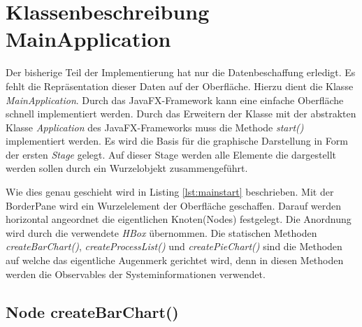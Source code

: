 \section{Klassenbeschreibung MainApplication}
Der bisherige Teil der Implementierung hat nur die Datenbeschaffung erledigt. Es fehlt die Repräsentation dieser Daten auf der Oberfläche. Hierzu dient die Klasse \textit{MainApplication}. Durch das JavaFX-Framework kann eine einfache Oberfläche schnell implementiert werden. Durch das Erweitern der Klasse mit der abstrakten Klasse \textit{Application} des JavaFX-Frameworks muss die Methode \textit{start()} implementiert werden. Es wird die Basis für die graphische Darstellung in Form der ersten \textit{Stage} gelegt. Auf dieser Stage werden alle Elemente die dargestellt werden sollen durch ein Wurzelobjekt zusammengeführt. 
 
Wie dies genau geschieht wird in Listing \ref{lst:mainstart} beschrieben. Mit der BorderPane wird ein Wurzelelement der Oberfläche geschaffen. Darauf werden horizontal angeordnet die eigentlichen Knoten(Nodes) festgelegt. Die Anordnung wird durch die verwendete \textit{HBox} übernommen. Die statischen Methoden \textit{createBarChart()}, \textit{createProcessList()} und \textit{createPieChart()} sind die Methoden auf welche das eigentliche Augenmerk gerichtet wird, denn in diesen Methoden werden die Observables der Systeminformationen verwendet. 
\subsection{Node createBarChart()}
